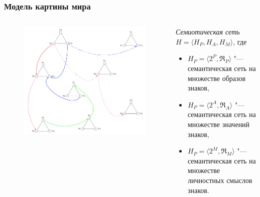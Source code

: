\documentclass[default]{beamer}
\begin{document}
	\begin{frame}
		\frametitle{Модель картины мира}
		
		\begin{columns}
			\begin{column}{0.55\textwidth}
				\begin{figure}
					\includegraphics[width=\textwidth]{signs/signs_net}
				\end{figure}
			\end{column}
			\begin{column}{0.45\textwidth}
				\textit{Семиотическая сеть} $H=\langle H_P, H_A, H_M\rangle$, где
				\begin{itemize}
					\item $H_P=\langle2^P,\mathfrak R_P\rangle$ "--- семантическая сеть на множестве образов знаков,
					\item $H_P=\langle2^A,\mathfrak R_A\rangle$ "--- семантическая сеть на множестве значений знаков,
					\item $H_P=\langle2^M,\mathfrak R_M\rangle$ "--- семантическая сеть на множестве личностных смыслов знаков.
				\end{itemize}
			\end{column}
		\end{columns}
	\end{frame}		
	
\end{document}
